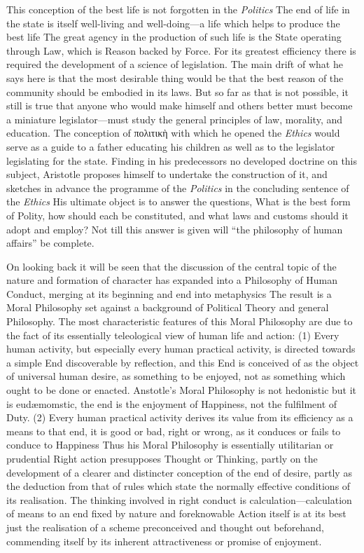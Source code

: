 This conception of the best life is not forgotten in the \emph{Politics} The
end of life in the state is itself well-living and well-doing—a life
which helps to produce the best life The great agency in the production of such
life is the State operating through Law, which is Reason backed by Force. For
its greatest efficiency there is required the development of a science of
legislation. The main drift of what he says here is that the most desirable
thing would be that the best reason of the community should be embodied in its
laws. But so far as that is not possible, it still is true that anyone who
would make himself and others better must become a miniature
legislator—must study the general principles of law, morality, and
education. The conception of πολιτικὴ
with which he opened the \emph{Ethics} would serve as a guide to a father
educating his children as well as to the legislator legislating for the state.
Finding in his predecessors no developed doctrine on this subject, Aristotle
proposes himself to undertake the construction of it, and sketches in advance
the programme of the \emph{Politics} in the concluding sentence of the
\emph{Ethics} His ultimate object is to answer the questions, What is the best
form of Polity, how should each be constituted, and what laws and customs
should it adopt and employ? Not till this answer is given will “the
philosophy of human affairs” be complete.

On looking back it will be seen that the discussion of the central topic of the
nature and formation of character has expanded into a Philosophy of Human
Conduct, merging at its beginning and end into metaphysics The result is a
Moral Philosophy set against a background of Political Theory and general
Philosophy. The most characteristic features of this Moral Philosophy are due
to the fact of its essentially teleological view of human life and action: (1)
Every human activity, but especially every human practical activity, is
directed towards a simple End discoverable by reflection, and this End is
conceived of as the object of universal human desire, as something to be
enjoyed, not as something which ought to be done or enacted. Anstotle’s
Moral Philosophy is not hedonistic but it is eudæmomstic, the end is the
enjoyment of Happiness, not the fulfilment of Duty. (2) Every human practical
activity derives its value from its efficiency as a means to that end, it is
good or bad, right or wrong, as it conduces or fails to conduce to Happiness
Thus his Moral Philosophy is essentially utilitarian or prudential Right action
presupposes Thought or Thinking, partly on the development of a clearer and
distincter conception of the end of desire, partly as the deduction from that
of rules which state the normally effective conditions of its realisation. The
thinking involved in right conduct is calculation—calculation of means to
an end fixed by nature and foreknowable Action itself is at its best just the
realisation of a scheme preconceived and thought out beforehand, commending
itself by its inherent attractiveness or promise of enjoyment.

